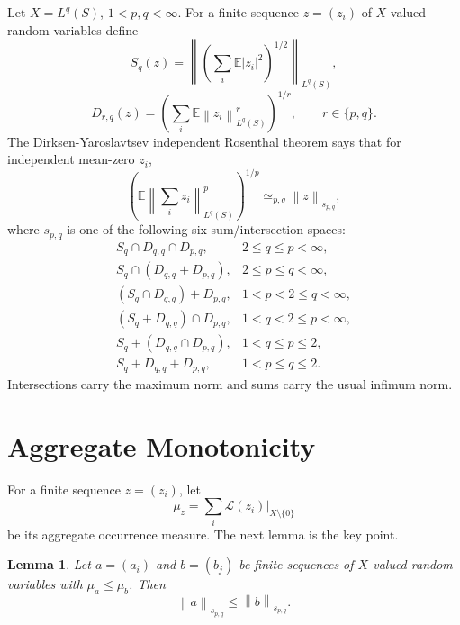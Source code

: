\documentclass[11pt]{article}
\newtheorem{lemma}{Lemma}
\newcommand{\E}{\mathbb E}
\newcommand{\norm}[1]{\left\lVert #1\right\rVert}
\newcommand{\simequiv}{\simeq}
\begin{document}
Let \(X=L^q(S)\), \(1<p,q<\infty\).  For a finite sequence
\(z=(z_i)\) of \(X\)-valued random variables define
\[
  S_q(z)=\left\|\left(\sum_i\E |z_i|^2\right)^{1/2}\right\|_{L^q(S)},
\]
\[
  D_{r,q}(z)=\left(\sum_i\E\norm{z_i}_{L^q(S)}^r\right)^{1/r},
  \qquad r\in\{p,q\}.
\]
The Dirksen-Yaroslavtsev independent Rosenthal theorem
\cite[Theorem 2.1]{DirksenYaroslavtsev2017} says that for independent
mean-zero \(z_i\),
\[
   \left(\E\norm{\sum_i z_i}_{L^q(S)}^p\right)^{1/p}
   \simequiv_{p,q}
   \norm{z}_{s_{p,q}},
\]
where \(s_{p,q}\) is one of the following six sum/intersection spaces:
\[
\begin{array}{ll}
S_q\cap D_{q,q}\cap D_{p,q}, & 2\le q\le p<\infty,\\
S_q\cap(D_{q,q}+D_{p,q}), & 2\le p\le q<\infty,\\
(S_q\cap D_{q,q})+D_{p,q}, & 1<p<2\le q<\infty,\\
(S_q+D_{q,q})\cap D_{p,q}, & 1<q<2\le p<\infty,\\
S_q+(D_{q,q}\cap D_{p,q}), & 1<q\le p\le2,\\
S_q+D_{q,q}+D_{p,q}, & 1<p\le q\le2.
\end{array}
\]
Intersections carry the maximum norm and sums carry the usual infimum norm.

\section*{Aggregate Monotonicity}

For a finite sequence \(z=(z_i)\), let
\[
   \mu_z=\sum_i\mathcal L(z_i)|_{X\setminus\{0\}}
\]
be its aggregate occurrence measure.  The next lemma is the key point.

\begin{lemma}\label{lem:monotone}
Let \(a=(a_i)\) and \(b=(b_j)\) be finite sequences of \(X\)-valued random
variables with \(\mu_a\leq\mu_b\).  Then
\[
   \norm{a}_{s_{p,q}}\leq \norm{b}_{s_{p,q}} .
\]
\end{lemma}
\end{document}
